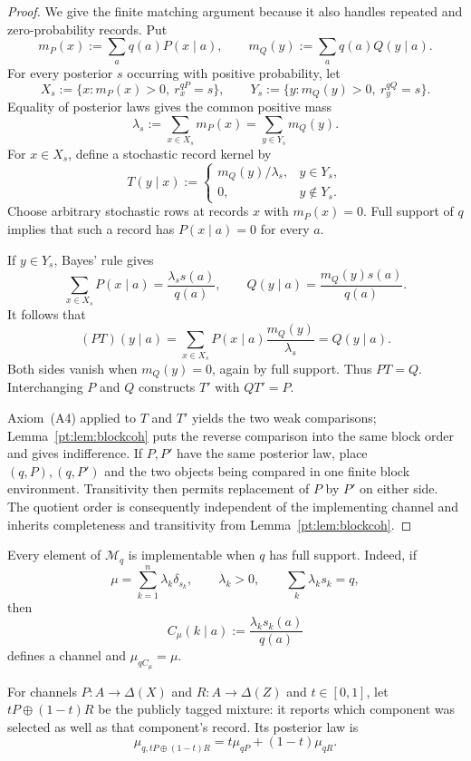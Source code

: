 \begin{proof}
We give the finite matching argument because it also handles repeated and
zero-probability records.  Put
\[
 m_P(x):=\sum_aq(a)P(x\mid a),
 \qquad
 m_Q(y):=\sum_aq(a)Q(y\mid a).
\]
For every posterior $s$ occurring with positive probability, let
\[
 X_s:=\{x:m_P(x)>0,\ r_x^{qP}=s\},
 \qquad
 Y_s:=\{y:m_Q(y)>0,\ r_y^{qQ}=s\}.
\]
Equality of posterior laws gives the common positive mass
\[
 \lambda_s:=\sum_{x\in X_s}m_P(x)
            =\sum_{y\in Y_s}m_Q(y).
\]
For $x\in X_s$, define a stochastic record kernel by
\[
 T(y\mid x):=
 \begin{cases}
   m_Q(y)/\lambda_s,&y\in Y_s,\\
   0,&y\notin Y_s.
 \end{cases}
\]
Choose arbitrary stochastic rows at records $x$ with $m_P(x)=0$.  Full support
of $q$ implies that such a record has $P(x\mid a)=0$ for every $a$.

If $y\in Y_s$, Bayes' rule gives
\[
 \sum_{x\in X_s}P(x\mid a)
 =\frac{\lambda_s s(a)}{q(a)},
 \qquad
 Q(y\mid a)=\frac{m_Q(y)s(a)}{q(a)}.
\]
It follows that
\[
 (PT)(y\mid a)
 =\sum_{x\in X_s}P(x\mid a)\frac{m_Q(y)}{\lambda_s}
 =Q(y\mid a).
\]
Both sides vanish when $m_Q(y)=0$, again by full support.  Thus $PT=Q$.
Interchanging $P$ and $Q$ constructs $T'$ with $QT'=P$.

Axiom~\textup{(A4)} applied to $T$ and $T'$ yields the two weak comparisons;
Lemma~\ref{pt:lem:blockcoh} puts the reverse comparison into the same block
order and gives indifference.  If $P,P'$ have the same posterior law, place
$(q,P),(q,P')$ and the two objects being compared in one finite block
environment.  Transitivity then permits replacement of $P$ by $P'$ on either
side.  The quotient order is consequently independent of the implementing
channel and inherits completeness and transitivity from
Lemma~\ref{pt:lem:blockcoh}.
\end{proof}

Every element of $\mathcal M_q$ is implementable when $q$ has full support.
Indeed, if
\[
 \mu=\sum_{k=1}^n\lambda_k\delta_{s_k},
 \qquad \lambda_k>0,
 \qquad \sum_k\lambda_ks_k=q,
\]
then
\begin{equation}
 C_\mu(k\mid a):=\frac{\lambda_ks_k(a)}{q(a)}
 \label{pt:eq:canonical-implementation}
\end{equation}
defines a channel and $\mu_{qC_\mu}=\mu$.

For channels $P:A\to\Delta(X)$ and $R:A\to\Delta(Z)$ and
$t\in[0,1]$, let $tP\oplus(1-t)R$ be the publicly tagged mixture: it
reports which component was selected as well as that component's record.  Its
posterior law is
\begin{equation}
 \mu_{q,tP\oplus(1-t)R}
 =t\mu_{qP}+(1-t)\mu_{qR}.
 \label{pt:eq:public-posterior-mixture}
\end{equation}

